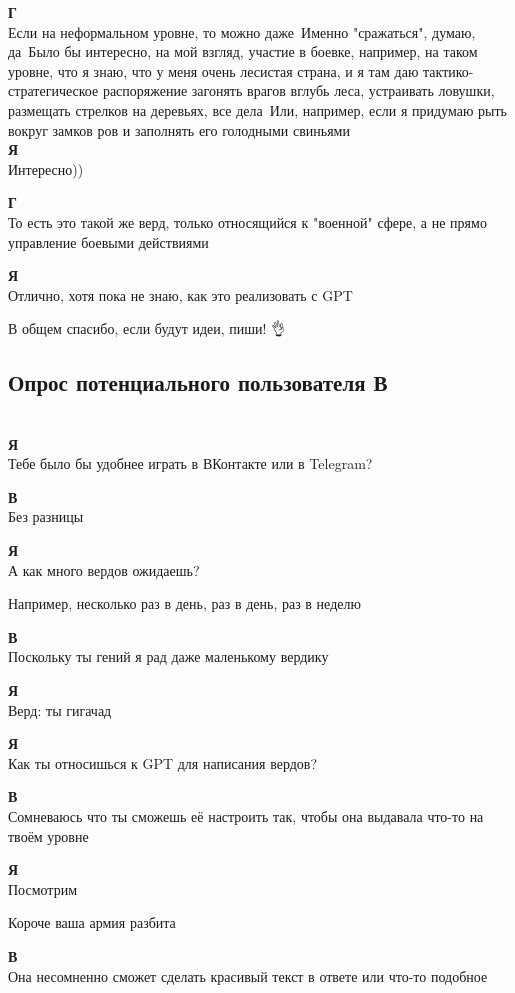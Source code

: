 \textbf{Г}\\
Если на неформальном уровне, то можно даже\
Именно "сражаться", думаю, да\
Было бы интересно, на мой взгляд, участие в боевке, например, на таком уровне, что я знаю, что у меня очень лесистая страна, и я там даю тактико-стратегическое распоряжение загонять врагов вглубь леса, устраивать ловушки, размещать стрелков на деревьях, все дела\
Или, например, если я придумаю рыть вокруг замков ров и заполнять его голодными свиньями\\

\textbf{Я}\\
Интересно))

\textbf{Г}\\
То есть это такой же верд, только относящийся к "военной" сфере, а не прямо управление боевыми действиями

\textbf{Я}\\
Отлично, хотя пока не знаю, как это реализовать с GPT

В общем спасибо, если будут идеи, пиши! 👌

\subsection{Опрос потенциального пользователя В}\\
\textbf{Я}\\
Тебе было бы удобнее играть в ВКонтакте или в Telegram?

\textbf{В}\\
Без разницы

\textbf{Я}\\
А как много вердов ожидаешь?

Например, несколько раз в день, раз в день, раз в неделю

\textbf{В}\\
Поскольку ты гений я рад даже маленькому вердику

\textbf{Я}\\
Верд: ты гигачад

\textbf{Я}\\
Как ты относишься к GPT для написания вердов?

\textbf{В}\\
Сомневаюсь что ты сможешь её настроить так, чтобы она выдавала что-то на твоём уровне

\textbf{Я}\\
Посмотрим

Короче ваша армия разбита

\textbf{В}\\
Она несомненно сможет сделать красивый текст в ответе или что-то подобное

